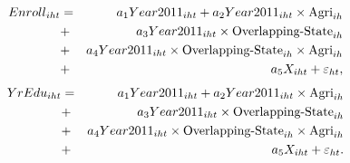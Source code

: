\documentclass[12pt,letterpaper]{article}
\newcommand{\0}{\ensuremath{\mbox{\boldmath $0$}}}
\begin{document}
\begin{eqnarray}
	{Enroll}_{iht} & = &
    a_1 {Year2011}_{iht}
    + a_2 {Year2011}_{iht}\times\textnormal{Agri}_{ih} \nonumber\\
    &+& a_3  {Year2011}_{iht}\times\textnormal{Overlapping-State}_{ih} \nonumber\\
    &+& a_4 {Year2011}_{iht}\times \textnormal{Overlapping-State}_{ih}\times\textnormal{Agri}_{ih}   \nonumber \\
    &+& a_5{X}_{iht} +\varepsilon_{ht}, \label{diff_enroll}
\end{eqnarray}
\begin{eqnarray}
	{YrEdu}_{iht} & = &
    a_1 {Year2011}_{iht}
    + a_2 {Year2011}_{iht}\times\textnormal{Agri}_{ih} \nonumber\\
    &+& a_3  {Year2011}_{iht}\times\textnormal{Overlapping-State}_{ih} \nonumber\\
    &+& a_4 {Year2011}_{iht}\times \textnormal{Overlapping-State}_{ih}\times\textnormal{Agri}_{ih}   \nonumber \\
    &+& a_5{X}_{iht} + \varepsilon_{ht}. \label{diff_edu}
\end{eqnarray}


 
\end{document}
